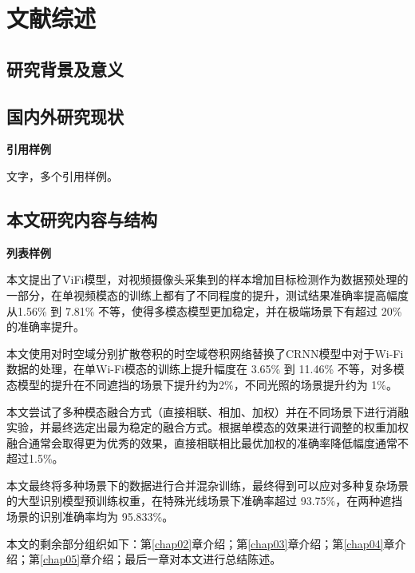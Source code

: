 
\chapter{文献综述}
\label{chap01}
\sloppy{}

\section{研究背景及意义}

\lipsum[1-2]

\section{国内外研究现状}

\textbf{引用样例}

文字\cite{khurana2018deep}，多个引用样例\cite{khurana2018deep,baccouche2011sequential}。

\section{本文研究内容与结构}

\textbf{列表样例}

\begin{asparaenum}[（1）]
\item 本文提出了ViFi模型，对视频摄像头采集到的样本增加目标检测作为数据预处理的一部分，在单视频模态的训练上都有了不同程度的提升，测试结果准确率提高幅度从1.56\% 到 7.81\% 不等，使得多模态模型更加稳定，并在极端场景下有超过 20\% 的准确率提升。
\item 本文使用对时空域分别扩散卷积的时空域卷积网络替换了CRNN模型中对于Wi-Fi数据的处理，在单Wi-Fi模态的训练上提升幅度在 3.65\% 到 11.46\% 不等，对多模态模型的提升在不同遮挡的场景下提升约为2\%，不同光照的场景提升约为 1\%。
\item 本文尝试了多种模态融合方式（直接相联、相加、加权）并在不同场景下进行消融实验，并最终选定出最为稳定的融合方式。根据单模态的效果进行调整的权重加权融合通常会取得更为优秀的效果，直接相联相比最优加权的准确率降低幅度通常不超过1.5\%。
\item 本文最终将多种场景下的数据进行合并混杂训练，最终得到可以应对多种复杂场景的大型识别模型预训练权重，在特殊光线场景下准确率超过 93.75\%，在两种遮挡场景的识别准确率均为 95.833\%。
\end{asparaenum}

本文的剩余部分组织如下：第\ref{chap02}章介绍；第\ref{chap03}章介绍；第\ref{chap04}章介绍；第\ref{chap05}章介绍；最后一章对本文进行总结陈述。

